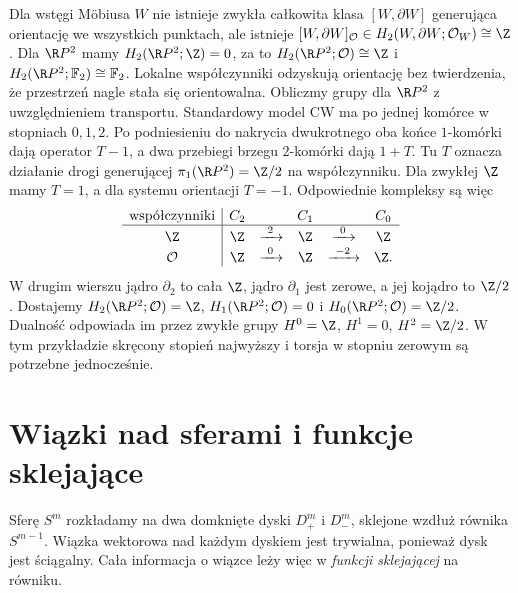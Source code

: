 \begin{przyklad}
\label{prz:pd-rp2-21}
Dla wstęgi Möbiusa $W$
nie istnieje zwykła
całkowita klasa
$[W,\partial W]$
generująca orientację
we wszystkich punktach,
ale istnieje
$[W,\partial W]_{\mathcal O}
\in H_2(W,\partial W;\mathcal O_W)
\cong\Z$.
Dla $\R P^2$ mamy
$H_2(\R P^2;\Z)=0$,
za to
$H_2(\R P^2;\mathcal O)\cong\Z$
i $H_2(\R P^2;\mathbb F_2)
\cong\mathbb F_2$.
Lokalne współczynniki
odzyskują orientację
bez twierdzenia,
że przestrzeń nagle
stała się orientowalna.
Obliczmy grupy dla $\R P^2$ z uwzględnieniem transportu.
Standardowy model CW ma po jednej komórce w stopniach $0,1,2$.
Po podniesieniu do nakrycia dwukrotnego oba końce $1$-komórki
dają operator $T-1$, a dwa przebiegi brzegu $2$-komórki
dają $1+T$. Tu $T$ oznacza działanie drogi generującej
$\pi_1(\R P^2)=\Z/2$ na współczynniku.
Dla zwykłej $\Z$ mamy $T=1$, a dla systemu orientacji $T=-1$.
Odpowiednie kompleksy są więc
\[
 \begin{array}{c|ccccc}
  \text{współczynniki}&C_2&&C_1&&C_0\\ \hline
  \Z&\Z&\xrightarrow{\ 2\ }&\Z&\xrightarrow{\ 0\ }&\Z\\
  \mathcal O&\Z&\xrightarrow{\ 0\ }&\Z&\xrightarrow{\ -2\ }&\Z .
 \end{array}
\]
W drugim wierszu jądro $\partial_2$ to cała $\Z$,
jądro $\partial_1$ jest zerowe, a jej kojądro to $\Z/2$.
Dostajemy $H_2(\R P^2;\mathcal O)=\Z$,
$H_1(\R P^2;\mathcal O)=0$ i
$H_0(\R P^2;\mathcal O)=\Z/2$.
Dualność odpowiada im przez zwykłe grupy
$H^0=\Z$, $H^1=0$, $H^2=\Z/2$.
W tym przykładzie skręcony stopień najwyższy i torsja
w stopniu zerowym są potrzebne jednocześnie.
\end{przyklad}

\section{Wiązki nad sferami i funkcje sklejające}
\label{sec:clutching-16}

Sferę $S^m$ rozkładamy na dwa
domknięte dyski $D^m_+$ i $D^m_-$,
sklejone wzdłuż równika
$S^{m-1}$. Wiązka wektorowa
nad każdym dyskiem jest
trywialna, ponieważ dysk
jest ściągalny. Cała informacja
o wiązce leży więc w
\emph{funkcji sklejającej}
na równiku.

